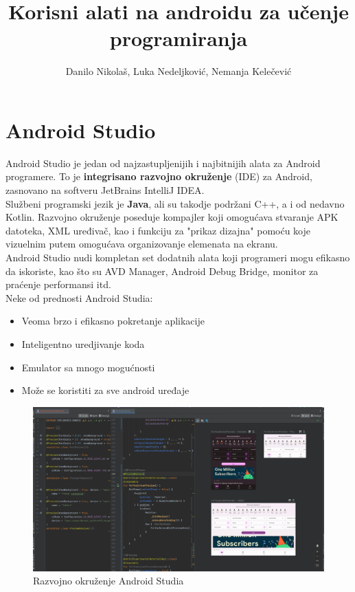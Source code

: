 \documentclass[12pt]{article}
\title{Korisni alati na androidu za učenje programiranja}
\author{Danilo Nikolaš, Luka Nedeljković, Nemanja Kelečević}
\begin{document}
\maketitle
\pagebreak

\section{Android Studio}
Android Studio je jedan od najzastupljenijih i najbitnijih alata za Android programere. To je \textbf{integrisano razvojno okruženje} (IDE) za Android, zasnovano na softveru JetBrains IntelliJ IDEA.  \\
Službeni programski jezik je \textbf{Java}, ali su takodje podržani C++, a i od nedavno Kotlin. Razvojno okruženje poseduje kompajler koji omogućava stvaranje APK datoteka, XML uređivač, kao i funkciju za "prikaz dizajna" pomoću koje vizuelnim putem omogućava organizovanje elemenata na ekranu. \\
Android Studio nudi kompletan set dodatnih alata koji programeri mogu efikasno da iskoriste, kao što su AVD Manager, Android Debug Bridge, monitor za praćenje performansi itd.\\
Neke od prednosti Android Studia:
\begin{itemize}
\item{Veoma brzo i efikasno pokretanje aplikacije}
\item{Inteligentno uredjivanje koda} 
\item{Emulator sa mnogo mogućnosti}
\item{Može se koristiti za sve android uređaje}
\end{itemize}

\begin{figure}[ht!]
    \centering
    \includegraphics[scale=0.2]{android_studio_interface.png}
    \caption{Razvojno okruženje Android Studia}
\end{figure}
\end{document}
